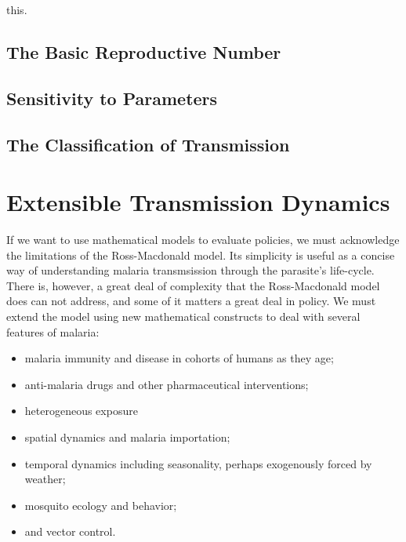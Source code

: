\documentclass[
]{book}
\begin{document}
this.

\hypertarget{the-basic-reproductive-number}{%
\section{The Basic Reproductive Number}\label{the-basic-reproductive-number}}

\hypertarget{sensitivity-to-parameters}{%
\section{Sensitivity to Parameters}\label{sensitivity-to-parameters}}

\hypertarget{the-classification-of-transmission}{%
\section{The Classification of Transmission}\label{the-classification-of-transmission}}

\hypertarget{extensible-transmission-dynamics}{%
\chapter{Extensible Transmission Dynamics}\label{extensible-transmission-dynamics}}

If we want to use mathematical models to evaluate policies, we must acknowledge the limitations of the Ross-Macdonald model. Its simplicity is useful as a concise way of understanding malaria transmsission through the parasite's life-cycle. There is, however, a great deal of complexity that the Ross-Macdonald model does can not address, and some of it matters a great deal in policy. We must extend the model using new mathematical constructs to deal with several features of malaria:

\begin{itemize}
\item
  malaria immunity and disease in cohorts of humans as they age;
\item
  anti-malaria drugs and other pharmaceutical interventions;
\item
  heterogeneous exposure
\item
  spatial dynamics and malaria importation;
\item
  temporal dynamics including seasonality, perhaps exogenously forced by weather;
\item
  mosquito ecology and behavior;
\item
  and vector control.
\end{itemize}
\end{document}
